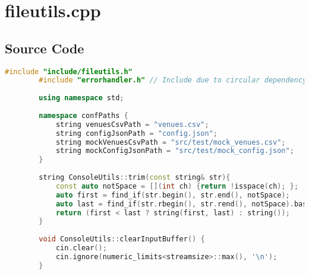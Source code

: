 \documentclass{article}
\begin{document}
	\section{fileutils.cpp}
	
	\subsection*{Source Code}
	\begin{mdframed}[backgroundcolor=background, hidealllines=false, innerleftmargin=15pt, innerrightmargin=5pt, innertopmargin=0pt, innerbottommargin=-5pt, linecolor=accent]
	\begin{lstlisting}[language=C++]
		#include "include/fileutils.h"
		#include "errorhandler.h" // Include due to circular dependency between fileutils.h and errorhandler.h
		
		using namespace std;
		
		namespace confPaths {
			string venuesCsvPath = "venues.csv";
			string configJsonPath = "config.json";
			string mockVenuesCsvPath = "src/test/mock_venues.csv";
			string mockConfigJsonPath = "src/test/mock_config.json";
		}
		
		string ConsoleUtils::trim(const string& str){
			const auto notSpace = [](int ch) {return !isspace(ch); };
			auto first = find_if(str.begin(), str.end(), notSpace);
			auto last = find_if(str.rbegin(), str.rend(), notSpace).base();
			return (first < last ? string(first, last) : string());
		}
		
		void ConsoleUtils::clearInputBuffer() {
			cin.clear();
			cin.ignore(numeric_limits<streamsize>::max(), '\n');
		}
		

\end{lstlisting}
\end{mdframed}
\end{document}
